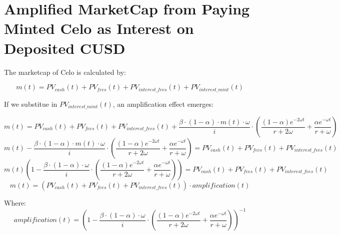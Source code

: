\section{Amplified MarketCap from Paying Minted Celo as Interest on Deposited CUSD}

The marketcap of Celo is calculated by:

\begin{equation}
    m(t) = PV_{cash}(t) + PV_{fees}(t) + PV_{interest\_fees}(t) + PV_{interest\_mint}(t)
\end{equation}

If we substitue in $PV_{interest\_mint}(t)$, an amplification effect emerges:

\begin{equation}
    m(t) = PV_{cash}(t) + PV_{fees}(t) + PV_{interest\_fees}(t) + \frac{\beta \cdot (1 - \alpha)\cdot m(t) \cdot \omega}{i} \cdot \left( \frac{(1-\alpha)e^{-2\omega t}}{r+2\omega} + \frac{\alpha e^{-\omega t}}{r+\omega} \right)
\end{equation}
\begin{equation}
    m(t) - \frac{\beta \cdot (1 - \alpha)\cdot m(t) \cdot \omega}{i} \cdot \left( \frac{(1-\alpha)e^{-2\omega t}}{r+2\omega} + \frac{\alpha e^{-\omega t}}{r+\omega} \right) = PV_{cash}(t) + PV_{fees}(t) + PV_{interest\_fees}(t)
\end{equation}
\begin{equation}
    m(t)\left(1 - \frac{\beta \cdot (1 - \alpha)\cdot \omega}{i} \cdot \left( \frac{(1-\alpha)e^{-2\omega t}}{r+2\omega} + \frac{\alpha e^{-\omega t}}{r+\omega} \right)\right) = PV_{cash}(t) + PV_{fees}(t) + PV_{interest\_fees}(t)
\end{equation}
\begin{equation}
    m(t) = (PV_{cash}(t) + PV_{fees}(t) + PV_{interest\_fees}(t)) \cdot amplification(t)
\end{equation}

Where:
\begin{equation}
    amplification(t) = \left(1 - \frac{\beta \cdot (1 - \alpha)\cdot \omega}{i} \cdot \left( \frac{(1-\alpha)e^{-2\omega t}}{r+2\omega} + \frac{\alpha e^{-\omega t}}{r+\omega} \right)\right)^{-1}
\end{equation}
